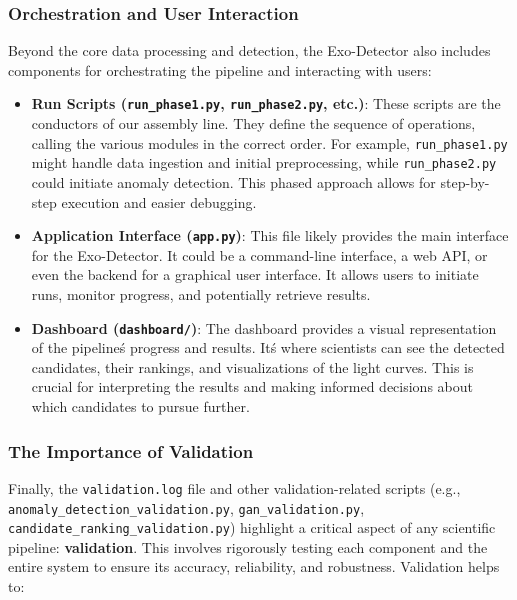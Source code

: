 \documentclass{article}
\begin{document}
\subsubsection{Orchestration and User Interaction}

Beyond the core data processing and detection, the Exo-Detector also includes components for orchestrating the pipeline and interacting with users:

\begin{itemize}
    \item \textbf{Run Scripts (\texttt{run\_phase1.py}, \texttt{run\_phase2.py}, etc.)}: These scripts are the conductors of our assembly line. They define the sequence of operations, calling the various modules in the correct order. For example, \texttt{run\_phase1.py} might handle data ingestion and initial preprocessing, while \texttt{run\_phase2.py} could initiate anomaly detection. This phased approach allows for step-by-step execution and easier debugging.

    \item \textbf{Application Interface (\texttt{app.py})}: This file likely provides the main interface for the Exo-Detector. It could be a command-line interface, a web API, or even the backend for a graphical user interface. It allows users to initiate runs, monitor progress, and potentially retrieve results.

    \item \textbf{Dashboard (\texttt{dashboard/})}: The dashboard provides a visual representation of the pipeline\'s progress and results. It\'s where scientists can see the detected candidates, their rankings, and visualizations of the light curves. This is crucial for interpreting the results and making informed decisions about which candidates to pursue further.
\end{itemize}

\subsubsection{The Importance of Validation}

Finally, the \texttt{validation.log} file and other validation-related scripts (e.g., \texttt{anomaly\_detection\_validation.py}, \texttt{gan\_validation.py}, \texttt{candidate\_ranking\_validation.py}) highlight a critical aspect of any scientific pipeline: \textbf{validation}. This involves rigorously testing each component and the entire system to ensure its accuracy, reliability, and robustness. Validation helps to:
\end{document}
